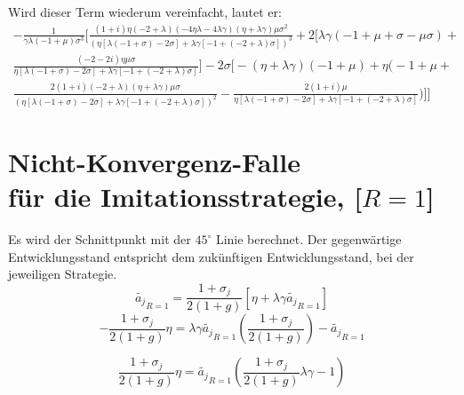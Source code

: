 Wird dieser Term wiederum vereinfacht, lautet er: 
\begin{equation}
\begin{split}
\left.-\frac{1}{\gamma \lambda (-1 + \mu) \sigma ^{3}}\Bigg[\frac{(1+i) \eta (-2 + \lambda)(-4\eta \lambda - 4\lambda \gamma)(\eta+\lambda \gamma)\mu\sigma^{2}}{\left(\eta [\lambda (-1+ \sigma) -2\sigma]+\lambda\gamma[-1 +(-2+\lambda)\sigma]\right)^{3}}
+2\Big[\lambda \gamma(-1 + \mu +\sigma-\mu\sigma)+\right.\\ 
\left.\frac{(-2-2i)\eta\mu\sigma}{\eta[\lambda(-1+\sigma)-2 \sigma] + \lambda\gamma[-1+(-2+\lambda)\sigma]}\Big]-2\sigma\bigg[-( \eta + \lambda \gamma)(-1 + \mu) + \eta\Big(-1 +\mu+\right.\\
\left. \frac{2(1+i)(-2+ \lambda)(\eta + \lambda \gamma) \mu \sigma}{\left(\eta[\lambda (-1+ \sigma) -2\sigma] + \lambda \gamma[-1+(-2+\lambda)\sigma]\right)^2}-\frac{2 (1+ i)\mu}{\eta [\lambda (-1+\sigma)-2\sigma] + \lambda \gamma [-1 + (-2 + \lambda) \sigma]} \Big)\bigg]\Bigg]\right.
\end{split}
\end{equation}


\section[Nicht-Konvergenz-Falle für die Imitationsstrategie, ${[R=1]}$]{Nicht-Konvergenz-Falle \\ für die Imitations\-strategie, [$R=1$] }\label{NichtKonvergenzFalleImitation}
Es wird der Schnittpunkt mit der $45^\circ$ Linie berechnet. Der gegenwärtige Entwicklungsstand entspricht dem zukünftigen Entwicklungsstand, bei der jeweiligen Strategie.
\begin{equation}
\tilde{a_j}_{R=1}=\frac{1+\sigma_j}{2(1+g)}[\eta+\lambda\gamma\tilde{a_j}_{R=1}]
\end{equation}
\begin{equation}
-\frac{1+\sigma_j}{2(1+g)}\eta=\lambda\gamma\tilde{a_j}_{R=1}\left(\frac{1+\sigma_j}{2(1+g)}\right)-\tilde{a_j}_{R=1}
\end{equation}

\begin{equation}
\frac{1+\sigma_j}{2(1+g)}\eta=\tilde{a_j}_{R=1}\left(\frac{1+\sigma_j}{2(1+g)}\lambda\gamma-1\right)
\end{equation}


